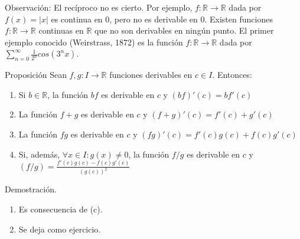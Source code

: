 \documentclass{beamer}
\newcounter{saveenumi}
\newcommand{\seti}{\setcounter{saveenumi}{\value{enumi}}}
\begin{document}
\begin{frame}
Observación:
El recíproco no es cierto. Por ejemplo, $f:\mathbb{R}\rightarrow\mathbb{R}$ dada por $f(x) = \left|x\right|$ es continua en 0, pero no es derivable en 0.
Existen funciones $f:\mathbb{R}\rightarrow\mathbb{R}$ continuas en $\mathbb{R}$ que no son derivables en ningún punto. El primer ejemplo conocido (Weirstrass, 1872) es la función $f:\mathbb{R}\rightarrow\mathbb{R}$ dada por $\sum_{n=0}^{\infty} \frac{1}{2^{n}}cos(3^{n}x)$.
\begin{block}{Proposición}
Sean $f,g:I\rightarrow\mathbb{R}$ funciones derivables en $c\in{I}$. Entonces:

\begin{enumerate}[label=(\alph*)]
\item Si $b\in{\mathbb{R}}$, la función $bf$ es derivable en $c$ y $(bf)'(c)=bf'(c)$
\item La función $f+g$ es derivable en $c$ y $(f+g)'(c)=f'(c)+g'(c)$
\item La función $fg$ es derivable en $c$ y $(fg)'(c)=f'(c)g(c)+f(c)g'(c)$
\item Si, además, $\forall{x}\in{I}:g(x)\neq0$, la función $f/g$ es derivable en $c$ y $(f/g)=\frac{f'(c)g(c)-f(c)g'(c)}{(g(c))^{2}}$
\end{enumerate}
\end{block}
Demostración.\\
\begin{enumerate}[label=(\alph*)]
\item Es consecuencia de (c).
\item Se deja como ejercicio.
\seti
\end{enumerate}
\end{frame}
\end{document}
